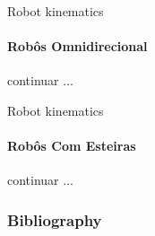 \documentclass[aspectratio=169]{beamer}
\begin{document}
\begin{frame}{Robot kinematics}
    \framesubtitle{Robôs Omnidirecional}
    continuar ...
\end{frame}

\begin{frame}{Robot kinematics}
    \framesubtitle{Robôs Com Esteiras}
    continuar ...
\end{frame}

  
\begin{frame}[t, allowframebreaks]
	\frametitle{Bibliography}
	
\end{frame}
  
\end{document}
